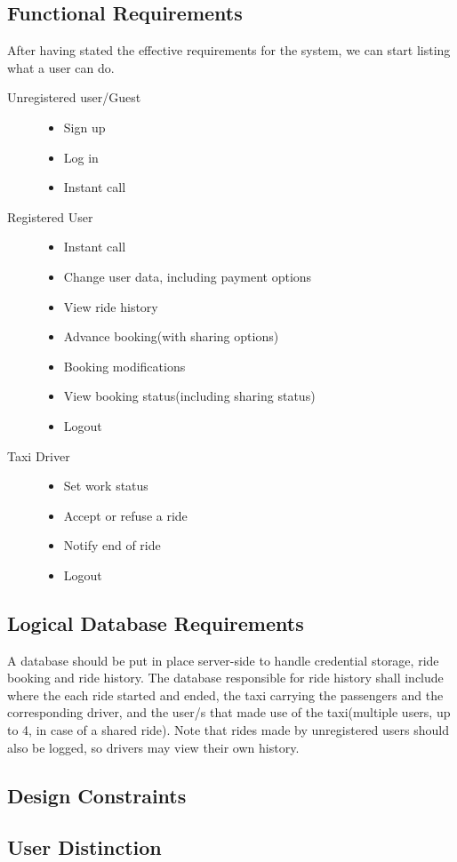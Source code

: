 \subsection{Functional Requirements}
	After having stated the effective requirements for the system, we can start listing what a user can do.
		\begin{description}
		\item[Unregistered user/Guest] \hfill
			\begin{itemize}
				\item Sign up
				\item Log in
				\item Instant call
			\end{itemize}
		\item[Registered User] \hfill
			\begin{itemize}
				\item Instant call
				\item Change user data, including payment options
				\item View ride history
				\item Advance booking(with sharing options)
				\item Booking modifications
				\item View booking status(including sharing status)
				\item Logout
			\end{itemize}
		\item[Taxi Driver] \hfill
			\begin{itemize}
				\item Set work status
				\item Accept or refuse a ride
				\item Notify end of ride
				\item Logout
			\end{itemize}
		\end{description}
\newpage
\subsection{Logical Database Requirements}
	A database should be put in place server-side to handle credential storage, ride booking and ride history. The database responsible for ride history
	shall include where the each ride started and ended, the taxi carrying the passengers and the corresponding driver, and the user/s that made use of the
	taxi(multiple users, up to 4, in case of a shared ride). Note that rides made by unregistered users should also be logged, so drivers may view their own history.
\subsection{Design Constraints}

\subsection{User Distinction}

